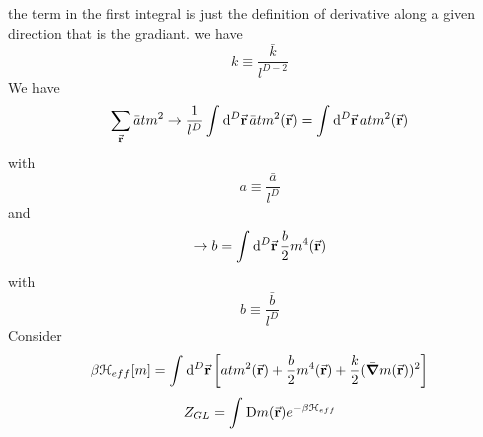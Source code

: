 \documentclass[../main/main.tex]{subfiles}
\begin{document}
the term in the first integral is just the definition of derivative along a given direction that is the gradiant.
we have
\begin{equation}
  k \equiv \frac{\bar{k} }{l^{D-2}}
\end{equation}
We have
\begin{equation}
  \sum_{\va{r}}^{} \bar{a}  t m^2 \rightarrow  \frac{1}{l^D} \int_{}^{} \dd[D]{\va{r}}  \bar{a}   t m^2 (\va{r}) = \int_{}^{} \dd[D]{\va{r}}  a t m^2 (\va{r})
\end{equation}
with
\begin{equation}
  a \equiv \frac{\bar{a} }{l^D}
\end{equation}
and
\begin{equation}
  \rightarrow b = \int_{}^{} \dd[D]{\va{r}} \frac{b}{2} m^4 (\va{r})
\end{equation}
with
\begin{equation}
  b \equiv \frac{\bar{b} }{l^D}
\end{equation}
Consider
\begin{equation}
  \beta \mathcal{H}_{eff} [m] = \int_{}^{} \dd[D]{\va{r}} \qty[a t m^2 (\va{r}) + \frac{b}{2} m^4 (\va{r}) + \frac{k}{2} (\bar{\grad } m (\va{r}))^2]
\end{equation}
\begin{equation}
  Z_{GL} = \int_{}^{} \text{D} m(\va{r}) e^{-\beta \mathcal{H}_{eff}}
\end{equation}
\end{document}
